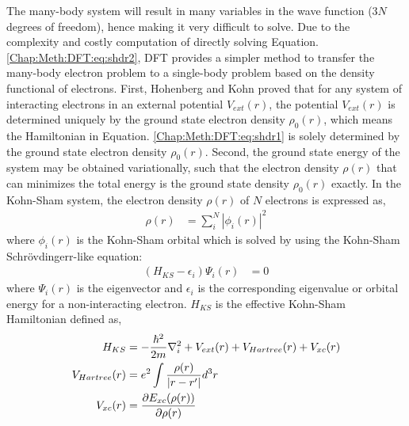 The many-body system will result in many variables in the wave function ($3N$ degrees of freedom), hence making it very difficult to solve. Due to the complexity and costly computation of directly solving Equation. \ref{Chap:Meth:DFT:eq:shdr2}, \acf{DFT} provides a simpler method to transfer the many-body electron problem to a single-body problem based on the density functional of electrons. \cite{wilson1984electron, kohn1965self} First, Hohenberg and Kohn proved that for any system of interacting electrons in an external potential $V_{ext}(r)$, the potential $V_{ext}(r)$ is determined uniquely by the ground state electron density $\rho_0(r)$, which means the Hamiltonian in Equation. \ref{Chap:Meth:DFT:eq:shdr1} is solely determined by the ground state electron density $\rho_0(r)$. Second, the ground state energy of the system may be obtained variationally, such that the electron density $\rho(r)$ that can minimizes the total energy is the ground state density $\rho_0(r)$ exactly. In the Kohn-Sham system, the electron density $\rho(r)$ of $N$ electrons \cite{kohn1965self} is expressed as,
\begin{subequations}
\begin{align}
\rho(r) & = \sum_i^N {|\phi_i(r)|}^2 \label{Chap:Meth:DFT:eq:ks_rho}
\end{align}
\end{subequations}
where $\phi_i(r)$ is the Kohn-Sham orbital which is solved by using the Kohn-Sham Schr\"{o}vdingerr-like equation:
\begin{subequations}
\begin{align}
(H_{KS} - \epsilon_i) \Psi_i(r) & = 0 \label{Chap:Meth:DFT:eq:ks_1}
\end{align}
\end{subequations}
where $\Psi_i(r)$ is the eigenvector and $\epsilon_i$ is the corresponding eigenvalue or orbital energy for a non-interacting electron. $H_{KS}$ is the effective Kohn-Sham Hamiltonian defined as,
\begin{subequations}
\begin{align}
  H_{KS} & = -\frac{\hbar^2}{2m}\nabla_i^2 + V_{ext}(r) + V_{Hartree}(r) + V_{xc}(r) \label{Chap:Meth:DFT:eq:ks_H} \\ 
  \hfill
  V_{Hartree}(r) & = e^2\int \frac{\rho(r)}{|r - r'|} d^3r \label{Chap:Meth:DFT:eq:ks_Hartree}\\ 
  \hfill
  V_{xc}(r) & = \frac{\partial E_{xc}(\rho(r))}{\partial \rho(r)} \label{Chap:Meth:DFT:eq:ks_xc} 
\end{align}
\end{subequations}
